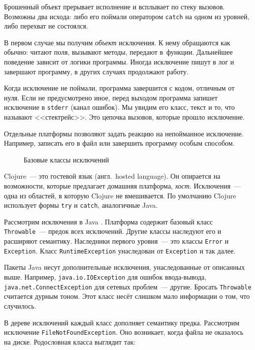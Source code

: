 Брошенный объект прерывает исполнение и всплывает по стеку вызовов. Возможны два
исхода: либо его поймали оператором \verb|catch| на одном из уровней, либо
перехват не состоялся.

В первом случае мы получим \emph{объект} исключения. К нему обращаются как
обычно: читают поля, вызывают методы, передают в~функции. Дальнейшее поведение
зависит от логики программы. Иногда исключение пишут в лог и завершают
программу, в других случаях продолжают работу.

Когда исключение не поймали, программа завершится с кодом, отличным от
нуля. Если не предусмотрено иное, перед выходом программа запишет исключение в
\verb|stderr| (канал ошибок). Мы увидим его класс, текст и то, что называют
<<стектрейс>>. Это цепочка вызовов, которые прошло исключение.


Отдельные платформы позволяют задать реакцию на непойманное
исключение. Например, записать его в файл или завершить программу особым
способом.

\begin{figure}[ht!]
  \caption{Базовые классы исключений}
  \label{fig:exceptions}
\end{figure}

Clojure~--- это гостевой язык (англ.~hosted language). Он опирается на возможности,
которые предлагает домашняя платформа, \emph{хост}. Исключения~--- одна из
областей, в которую Clojure не вмешивается. По умолчанию Clojure использует
формы \verb|try| и \verb|catch|, аналогичные Java.


Рассмотрим исключения в Java . Платформа содержит
базовый класс \texttt{Throwable}~--- предок всех исключений. Другие классы наследуют
его и расширяют семантику. Наследники первого уровня~--- это классы \verb|Error| и
\verb|Exception|. Класс \verb|RuntimeException| унаследован от \verb|Exception|
и так далее.


Пакеты Java несут дополнительные исключения, унаследованные от описанных
выше. Например, \verb|java.io.IOException| для ошибок ввода-вывода,
\verb|java.net.ConnectException| для сетевых проблем~--- другие. Бросать
\verb|Throwable| считается дурным тоном. Этот класс несёт слишком мало
информации о том, что случилось.

В дереве исключений каждый класс дополняет семантику предка. Рассмотрим
исключение \verb|FileNotFoundException|. Оно возникает, когда файла не
оказалось на диске. Родословная класса выглядит так:

